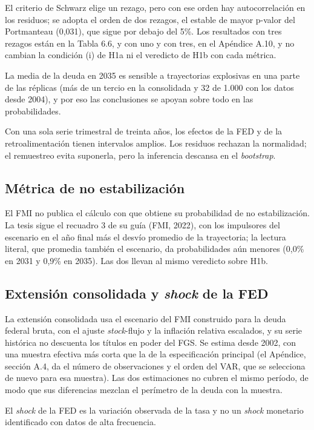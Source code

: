 El criterio de Schwarz elige un rezago, pero con ese orden hay
autocorrelación en los residuos; se adopta el orden de dos rezagos, el
estable de mayor p-valor del Portmanteau (0,031), que sigue por debajo
del 5\%. Los resultados con tres rezagos están en la Tabla 6.6, y con
uno y con tres, en el Apéndice A.10, y no cambian la condición (i) de
H1a ni el veredicto de H1b con cada métrica.

La media de la deuda en 2035 es sensible a trayectorias explosivas en
una parte de las réplicas (más de un tercio en la consolidada y 32 de
1.000 con los datos desde 2004), y por eso las conclusiones se apoyan
sobre todo en las probabilidades.

Con una sola serie trimestral de treinta años, los efectos de la FED y
de la retroalimentación tienen intervalos amplios. Los residuos rechazan
la normalidad; el remuestreo evita suponerla, pero la inferencia
descansa en el \emph{bootstrap}.

\subsection{Métrica de no estabilización}

El FMI no publica el cálculo con que obtiene su probabilidad de no
estabilización. La tesis sigue el recuadro 3 de su guía (FMI, 2022), con
los impulsores del escenario en el año final más el desvío promedio de
la trayectoria; la lectura literal, que promedia también el escenario,
da probabilidades aún menores (0,0\% en 2031 y 0,9\% en 2035). Las dos
llevan al mismo veredicto sobre H1b.

\subsection{\texorpdfstring{Extensión consolidada y \emph{shock} de la
FED}{Extensión consolidada y shock de la FED}}

La extensión consolidada usa el escenario del FMI construido para la
deuda federal bruta, con el ajuste \emph{stock}-flujo y la inflación
relativa escalados, y su serie histórica no descuenta los títulos en
poder del FGS. Se estima desde 2002, con una muestra efectiva más corta
que la de la especificación principal (el Apéndice, sección A.4, da el
número de observaciones y el orden del VAR, que se selecciona de nuevo
para esa muestra). Las dos estimaciones no cubren el mismo período, de
modo que sus diferencias mezclan el perímetro de la deuda con la
muestra.

El \emph{shock} de la FED es la variación observada de la tasa y no un
\emph{shock} monetario identificado con datos de alta frecuencia.
